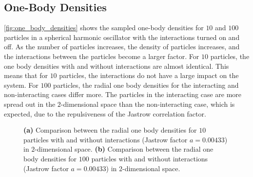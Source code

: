 \subsection{One-Body Densities}

\autoref{fig:one_body_densities} shows the sampled one-body densities for $10$ and $100$ particles in a spherical harmonic oscillator with the interactions turned on and off. As the number of particles increases, the density of particles increases, and the interactions between the particles become a larger factor. For $10$ particles, the one body densities with and without interactions are almost identical. This means that for $10$ particles, the interactions do not have a large impact on the system. For $100$ particles, the radial one body densities for the interacting and non-interacting cases differ more. The particles in the interacting case are more spread out in the $2$-dimensional space than the non-interacting case, which is expected, due to the repulsiveness of the Jastrow correlation factor. 
\begin{figure}[H]
\centering
{} 
\qquad
{}
\caption{\textbf{(a)} Comparison between the radial one body densities for $10$ particles with and without interactions (Jastrow factor $a=0.00433$) in $2$-dimensional space. \textbf{(b)} Comparison between the radial one body densities for $100$ particles with and without interactions (Jastrow factor $a=0.00433$) in $2$-dimensional space.}
\label{fig:one_body_densities}
\end{figure}



